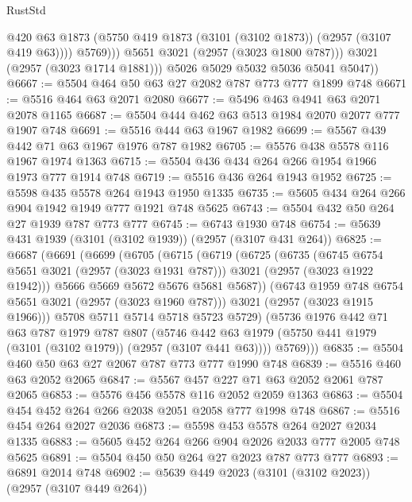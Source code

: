\begin{lexlean}{RustStd}
\begin{coremodule}
                    @420
                    @63
                    @1873
                    (@5750 @419 @1873 (@3101 (@3102 @1873)) (@2957 (@3107 @419 @63))))
                  @5769)))
            @5651
            @3021
            (@2957 (@3023 @1800 @787)))
          @3021
          (@2957 (@3023 @1714 @1881)))
        @5026
        @5029
        @5032
        @5036
        @5041
        @5047))
@6667 := @5504 @464 @50 @63 @27 @2082 @787 @773 @777 @1899 @748
@6671 := @5516 @464 @63 @2071 @2080
@6677 := @5496 @463 @4941 @63 @2071 @2078 @1165
@6687 := @5504 @444 @462 @63 @513 @1984 @2070 @2077 @777 @1907 @748
@6691 := @5516 @444 @63 @1967 @1982
@6699 := @5567 @439 @442 @71 @63 @1967 @1976 @787 @1982
@6705 := @5576 @438 @5578 @116 @1967 @1974 @1363
@6715 := @5504 @436 @434 @264 @266 @1954 @1966 @1973 @777 @1914 @748
@6719 := @5516 @436 @264 @1943 @1952
@6725 := @5598 @435 @5578 @264 @1943 @1950 @1335
@6735 := @5605 @434 @264 @266 @904 @1942 @1949 @777 @1921 @748 @5625
@6743 := @5504 @432 @50 @264 @27 @1939 @787 @773 @777
@6745 := @6743 @1930 @748
@6754 := @5639 @431 @1939 (@3101 (@3102 @1939)) (@2957 (@3107 @431 @264))
@6825 := @6687
    (@6691
      (@6699
        (@6705
          (@6715
            (@6719
              (@6725
                (@6735
                  (@6745 @6754 @5651 @3021 (@2957 (@3023 @1931 @787)))
                  @3021
                  (@2957 (@3023 @1922 @1942)))
                @5666
                @5669
                @5672
                @5676
                @5681
                @5687))
            (@6743 @1959 @748 @6754 @5651 @3021 (@2957 (@3023 @1960 @787)))
            @3021
            (@2957 (@3023 @1915 @1966)))
          @5708
          @5711
          @5714
          @5718
          @5723
          @5729)
        (@5736
          @1976
          @442
          @71
          @63
          @787
          @1979
          @787
          @807
          (@5746 @442 @63 @1979 (@5750 @441 @1979 (@3101 (@3102 @1979)) (@2957 (@3107 @441 @63))))
          @5769)))
@6835 := @5504 @460 @50 @63 @27 @2067 @787 @773 @777 @1990 @748
@6839 := @5516 @460 @63 @2052 @2065
@6847 := @5567 @457 @227 @71 @63 @2052 @2061 @787 @2065
@6853 := @5576 @456 @5578 @116 @2052 @2059 @1363
@6863 := @5504 @454 @452 @264 @266 @2038 @2051 @2058 @777 @1998 @748
@6867 := @5516 @454 @264 @2027 @2036
@6873 := @5598 @453 @5578 @264 @2027 @2034 @1335
@6883 := @5605 @452 @264 @266 @904 @2026 @2033 @777 @2005 @748 @5625
@6891 := @5504 @450 @50 @264 @27 @2023 @787 @773 @777
@6893 := @6891 @2014 @748
@6902 := @5639 @449 @2023 (@3101 (@3102 @2023)) (@2957 (@3107 @449 @264))

\end{coremodule}
\end{lexlean}

